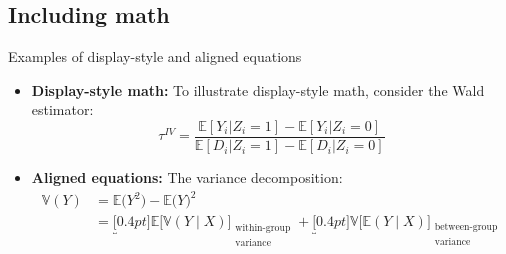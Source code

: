 
\subsection{Including math}

\begin{frame}{Examples of display-style and aligned equations}

\begin{itemize}
\item \textbf{Display-style math:} To illustrate display-style math, consider the Wald estimator:
\[
\tau^{IV} = \frac{\mathbb{E}[Y_i | Z_i = 1] - \mathbb{E}[Y_i | Z_i = 0]}{\mathbb{E}[D_i | Z_i = 1] - \mathbb{E}[D_i | Z_i = 0]}
\]

\vfill

\item \textbf{Aligned equations:} The variance decomposition:
\begin{align*}
\mathbb{V}(Y) &= \mathbb{E}\big( Y^2  \big) -  \mathbb{E}\big( Y \big)^2 \\
&= \underbracket[0.4pt]{\mathbb{E}\big[\mathbb{V}(Y \mid X)\big]}_{\substack{\text{within-group} \\ \text{variance}}} + \underbracket[0.4pt]{\mathbb{V}\big[\mathbb{E}(Y \mid X)\big]}_{\substack{\text{between-group} \\ \text{variance}}}
\end{align*}
\end{itemize}

\end{frame}
